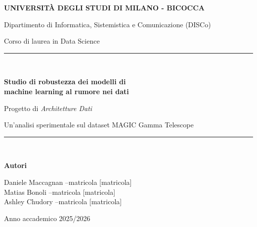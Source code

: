 \documentclass[12pt,a4paper]{article}
\begin{document}
\begin{titlepage}
\centering
\vspace*{0.6cm}
{\Large\bfseries UNIVERSIT\`A DEGLI STUDI DI MILANO - BICOCCA\par}
\vspace{0.4cm}
{\large Dipartimento di Informatica, Sistemistica e Comunicazione (DISCo)\par}
\vspace{0.2cm}
{\large Corso di laurea in Data Science\par}
\vspace{1.2cm}

\rule{\textwidth}{0.4pt}\\[0.4cm]
{\LARGE\bfseries Studio di robustezza dei modelli di\\ machine learning al rumore nei dati\par}
\vspace{0.35cm}
{\large Progetto di \textit{Architetture Dati}\par}
\vspace{0.25cm}
{\normalsize Un'analisi sperimentale sul dataset MAGIC Gamma Telescope\par}
\rule{\textwidth}{0.4pt}\\[1.4cm]

\begin{minipage}{0.9\textwidth}
\centering
{\large\bfseries Autori\par}
\vspace{0.3cm}
{\large
Daniele Maccagnan \quad--\quad matricola [matricola]\\[0.25cm]
Matias Bonoli \quad--\quad matricola [matricola]\\[0.25cm]
Ashley Chudory \quad--\quad matricola [matricola]\\
}
\end{minipage}

\vfill
{\large Anno accademico 2025/2026\par}
\end{titlepage}

\tableofcontents
\thispagestyle{plain}
\clearpage

\end{document}
